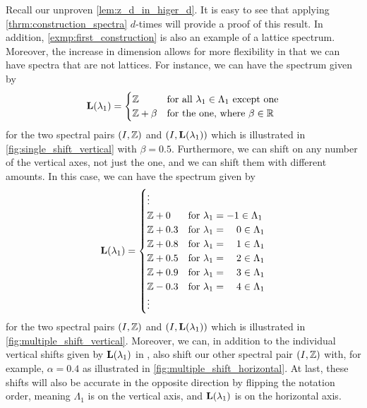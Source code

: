 \documentclass[../thesis.tex]{subfiles}
\begin{document}
Recall our unproven \cref{lem:z_d_in_higer_d}. It is easy to see that applying \cref{thrm:construction_spectra} $d$-times will provide a proof of this result. In addition, \cref{exmp:first_construction} is also an example of a lattice spectrum. %
Moreover, the increase in dimension allows for more flexibility in that we can have spectra that are not lattices. For instance, we can have the spectrum given by 
\begin{align}\label{eq:single_shift_func}
    \mathbf{L}(\lambda_1) = \begin{cases}        
        \mathbb{Z} & \text{for all } \lambda_1 \in \Lambda_1 \text{ except one}\\        
        \mathbb{Z}+\beta & \text{for the one, where } \beta \in \mathbb{R}   
    \end{cases}
\end{align}
for the two spectral pairs $(I,\mathbb{Z})$ and $(I,\mathbf{L}(\lambda_1))$ which is illustrated in \cref{fig:single_shift_vertical} with $\beta = 0.5$. Furthermore, we can shift on any number of the vertical axes, not just the one, and we can shift them with different amounts. In this case, we can have the spectrum given by 
\begin{align}\label{eq:multiple_shit_func}
    \mathbf{L}(\lambda_1) = \begin{cases}
        \vdots\\        
        \mathbb{Z}+0 & \text{for } \lambda_1 = -1 \in \Lambda_1\\
        \mathbb{Z}+0.3 & \text{for } \lambda_1 = \text{\space\space\space} 0 \in \Lambda_1\\
        \mathbb{Z}+0.8 & \text{for } \lambda_1 = \text{\space\space\space} 1 \in \Lambda_1\\
        \mathbb{Z}+0.5 & \text{for } \lambda_1 = \text{\space\space\space} 2 \in \Lambda_1\\
        \mathbb{Z}+0.9 & \text{for } \lambda_1 = \text{\space\space\space} 3 \in \Lambda_1\\
        \mathbb{Z}-0.3 & \text{for } \lambda_1 = \text{\space\space\space} 4 \in \Lambda_1\\
        \vdots
    \end{cases}
\end{align}
for the two spectral pairs $(I,\mathbb{Z})$ and $(I,\mathbf{L}(\lambda_1))$ which is illustrated in \cref{fig:multiple_shift_vertical}. Moreover, we can, in addition to the individual vertical shifts given by $\mathbf{L}(\lambda_1)$ in , also shift our other spectral pair $(I,\mathbb{Z})$ with, for example, $\alpha = 0.4$ as illustrated in \cref{fig:multiple_shift_horizontal}. At last, these shifts will also be accurate in the opposite direction by flipping the notation order, meaning $\Lambda_1$ is on the vertical axis, and $\mathbf{L}(\lambda_1)$ is on the horizontal axis.
\end{document}
